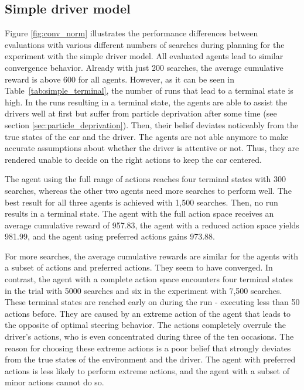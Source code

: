 \subsection{Simple driver model}

Figure \ref{fig:conv_norm} illustrates the performance differences between evaluations with various different numbers of searches during planning for the experiment with the simple driver model. All evaluated agents lead to similar convergence behavior. Already with just 200 searches, the average cumulative reward is above 600 for all agents. However, as it can be seen in Table~\ref{tab:simple_terminal}, the number of runs that lead to a terminal state is high. In the runs resulting in a terminal state, the agents are able to assist the drivers well at first but suffer from particle deprivation after some time (see section \ref{sec:particle_deprivation}). Then, their belief deviates noticeably from the true states of the car and the driver. The agents are not able anymore to make accurate assumptions about whether the driver is attentive or not. Thus, they are rendered unable to decide on the right actions to keep the car centered.



The agent using the full range of actions reaches four terminal states with 300 searches, whereas the other two agents need more searches to perform well. The best result for all three agents is achieved with 1,500 searches. Then, no run results in a terminal state. The agent with the full action space receives an average cumulative reward of 957.83, the agent with a reduced action space yields 981.99, and the agent using preferred actions gains 973.88. 

For more searches, the average cumulative rewards are similar for the agents with a subset of actions and preferred actions. They seem to have converged. In contrast, the agent with a complete action space encounters four terminal states in the trial with 5000 searches and six in the experiment with 7,500 searches. These terminal states are reached early on during the run - executing less than 50 actions before. They are caused by an extreme action of the agent that leads to the opposite of optimal steering behavior. The actions completely overrule the driver's actions, who is even concentrated during three of the ten occasions. The reason for choosing these extreme actions is a poor belief that strongly deviates from the true states of the environment and the driver. The agent with preferred actions is less likely to perform extreme actions, and the agent with a subset of minor actions cannot do so. 


